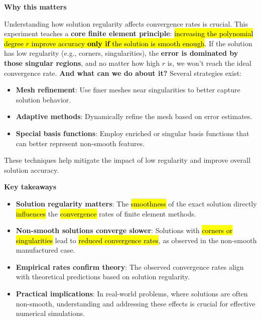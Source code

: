 \highspace
\begin{flushleft}
    \textcolor{Green3}{ \textbf{Why this matters}}
\end{flushleft}
Understanding how solution regularity affects convergence rates is crucial. This experiment teaches a \textbf{core finite element principle}: \hl{increasing the polynomial degree $r$ improve accuracy \textbf{only if} the solution is smooth enough}. If the solution has low regularity (e.g., corners, singularities), the \textbf{error is dominated by those singular regions}, and no matter how high $r$ is, we won't reach the ideal convergence rate. \textcolor{Green3}{ \textbf{And what can we do about it?}} Several strategies exist:
\begin{itemize}
    \item \textbf{Mesh refinement}: Use finer meshes near singularities to better capture solution behavior.
    \item \textbf{Adaptive methods}: Dynamically refine the mesh based on error estimates.
    \item \textbf{Special basis functions}: Employ enriched or singular basis functions that can better represent non-smooth features.
\end{itemize}
These techniques help mitigate the impact of low regularity and improve overall solution accuracy.

\begin{flushleft}
    \textcolor{Green3}{ \textbf{Key takeaways}}
\end{flushleft}
\begin{itemize}
    \item \textbf{Solution regularity matters}: The \hl{smoothness} of the exact solution directly \hl{influences} the \hl{convergence} rates of finite element methods.
    \item \textbf{Non-smooth solutions converge slower}: Solutions with \hl{corners or singularities} lead to \hl{reduced convergence rates}, as observed in the non-smooth manufactured case.
    \item \textbf{Empirical rates confirm theory}: The observed convergence rates align with theoretical predictions based on solution regularity.
    \item \textbf{Practical implications}: In real-world problems, where solutions are often non-smooth, understanding and addressing these effects is crucial for effective numerical simulations.
\end{itemize}

